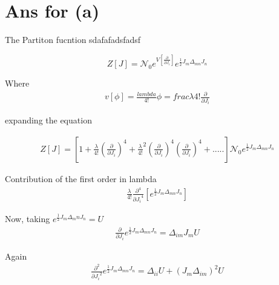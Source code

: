 \documentclass[12pt, letterpaper]{article}
\author{Noor E Mustafa Ferdous}
\title{}
\date{}
\newcommand*{\1}{\hspace{1pt}}
\begin{document}
    \maketitle
    
    \section*{Ans for (a)}
    
     The Partiton fucntion sdafafadsfadsf

    \begin{equation}
        Z[J] = \mathcal{N}_{0} e^{V[\frac{\partial}{\partial J_{i}}]} e^{\frac{1}{2} J_{m} \Delta _{mn} J_{n}}
    \end{equation}

    Where 
    \begin{align}
        v[\phi] = \frac{lambda}{4!} \phi = frac{\lambda}{4!}\frac{\partial}{\partial J_{i}}
    \end{align}

    expanding the equation 

    \begin{equation}
    \begin{split}
        Z[J] = [1 + \frac{\lambda}{4!}(\frac{\partial}{\partial J_{i}})^{4} + {\frac{\lambda}{4!}}^{2}(\frac{\partial}{\partial J_{i}})^{4}(\frac{\partial}{\partial J_{i}})^{4} + .....] \mathcal{N}_{0} e^{\frac{1}{2} J_{m} \Delta _{mn} J_{n}}
    \end{split}
    \end{equation}

    Contribution of the first order in lambda
    \begin{align}
        \frac{\lambda}{4!}\frac{\partial ^4}{{\partial J_{i}}^4} [e^{\frac{1}{2} J_{m} \Delta _{mn} J_{n}}]
    \end{align}
    
    Now, taking $e^{\frac{1}{2}J_{m}\Delta_{m}{n}J_{n}}=U$
    \begin{align}
        \frac{\partial}{\partial J_{i}} e^{\frac{1}{2}J_{m}\Delta_{mn}J_{n}} = \Delta_{im}J_{m}U 
    \end{align}

    Again    
    \begin{equation}
    \begin{split}
        \frac{\partial^2}{{\partial J_{i}}^2} e^{\frac{1}{2}J_{m}\Delta_{mn}J_{n}} = \Delta_{ii}U + (J_{m}\Delta_{im})^{2} U
    \end{split}
    \end{equation}
    
\end{document}
